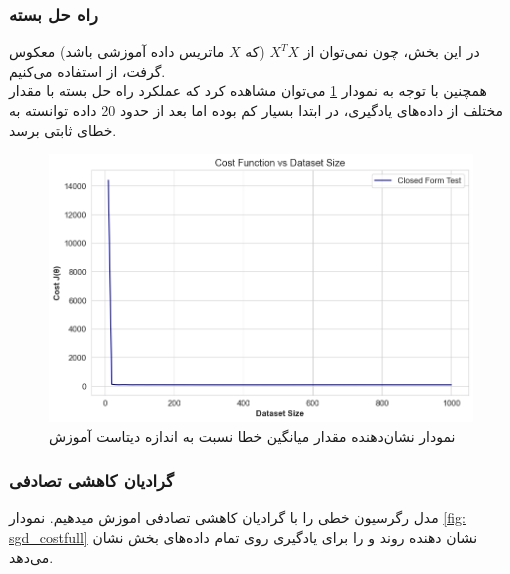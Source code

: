 \documentclass{article}
\begin{document}
	\subsubsection{راه حل بسته}
	در این بخش، چون نمی‌توان از $X^TX$ (که $X$ ماتریس داده آموزشی باشد) معکوس گرفت، از
	استفاده می‌کنیم.\\
	همچنین با توجه به نمودار
	\ref{fig: size closed}
	می‌توان مشاهده کرد که عملکرد راه حل بسته با مقدار مختلف از داده‌های یادگیری، در ابتدا بسیار کم بوده اما بعد از حدود 20 داده توانسته به خطای ثابتی برسد.
	\begin{figure}[H]
		\centering
		\includegraphics[scale=0.5]{figs/closed_size_test}
		\caption{نمودار نشان‌دهنده مقدار میانگین خطا نسبت به اندازه دیتاست آموزش}
		\label{fig: size closed}
	\end{figure}
	\subsubsection{گرادیان کاهشی تصادفی}
	مدل رگرسیون خطی را با گرادیان کاهشی تصادفی اموزش میدهیم. نمودار
	\ref{fig: sgd_costfull}
	نشان دهنده روند 
	و
	را برای یادگیری روی تمام داده‌های بخش
	نشان می‌دهد.
	
\end{document}
